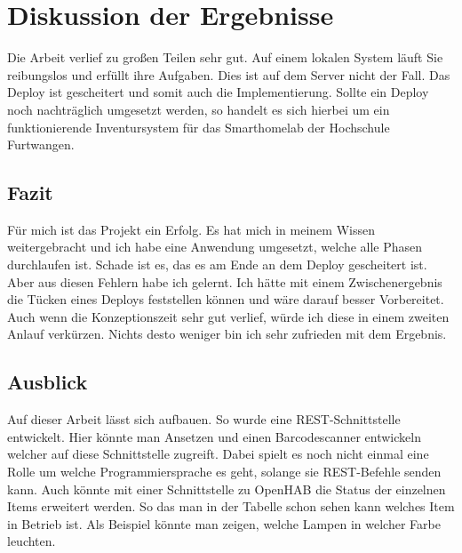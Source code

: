 \chapter{Diskussion der Ergebnisse}
\label{cha:discussion}
Die Arbeit verlief zu großen Teilen sehr gut. Auf einem lokalen System läuft Sie reibungslos und erfüllt ihre Aufgaben. Dies ist auf dem Server nicht der Fall. Das Deploy ist gescheitert und somit auch die Implementierung. Sollte ein Deploy noch nachträglich umgesetzt werden, so handelt es sich hierbei um ein funktionierende Inventursystem für das Smarthomelab der Hochschule Furtwangen.



\section{Fazit}
Für mich ist das Projekt ein Erfolg. Es hat mich in meinem Wissen weitergebracht und ich habe eine Anwendung umgesetzt, welche alle Phasen durchlaufen ist. Schade ist es, das es am Ende an dem Deploy gescheitert ist. Aber aus diesen Fehlern habe ich gelernt. Ich hätte mit einem Zwischenergebnis die Tücken eines Deploys feststellen können und wäre darauf besser Vorbereitet. Auch wenn die Konzeptionszeit sehr gut verlief, würde ich diese in einem zweiten Anlauf verkürzen. Nichts desto weniger bin ich sehr zufrieden mit dem Ergebnis.


\section{Ausblick}
Auf dieser Arbeit lässt sich aufbauen. So wurde eine \ac{REST}-Schnittstelle entwickelt. Hier könnte man Ansetzen und einen Barcodescanner entwickeln welcher auf diese Schnittstelle zugreift. Dabei spielt es noch nicht einmal eine Rolle um welche Programmiersprache es geht, solange sie REST-Befehle senden kann. Auch könnte mit einer Schnittstelle zu OpenHAB die Status der einzelnen Items erweitert werden. So das man in der Tabelle schon sehen kann welches Item in Betrieb ist. Als Beispiel könnte man zeigen, welche Lampen in welcher Farbe leuchten.